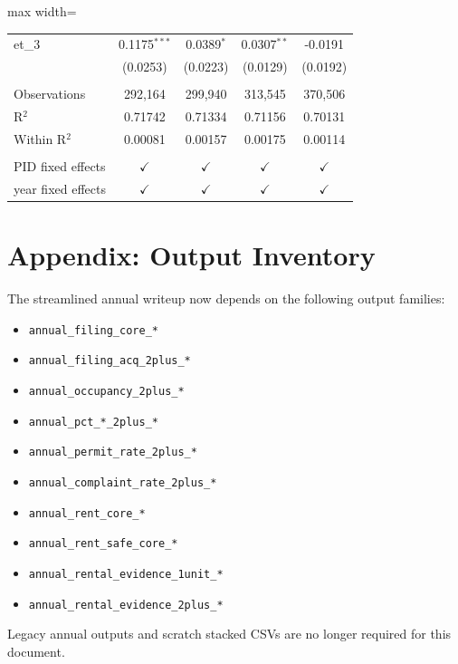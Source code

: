 \documentclass[
  11pt,
]{article}
\providecommand{\tightlist}{%
  \setlength{\itemsep}{0pt}\setlength{\parskip}{0pt}}
\begin{document}
\begin{adjustbox}{max width=\textwidth}
\begin{tabular}{lcccc}
   et\_3              & 0.1175$^{***}$       & 0.0389$^{*}$        & 0.0307$^{**}$   & -0.0191\\   
                      & (0.0253)             & (0.0223)            & (0.0129)        & (0.0192)\\   
    \\
   Observations       & 292,164              & 299,940             & 313,545         & 370,506\\  
   R$^2$              & 0.71742              & 0.71334             & 0.71156         & 0.70131\\  
   Within R$^2$       & 0.00081              & 0.00157             & 0.00175         & 0.00114\\  
    \\
   PID fixed effects  & $\checkmark$         & $\checkmark$        & $\checkmark$    & $\checkmark$\\   
   year fixed effects & $\checkmark$         & $\checkmark$        & $\checkmark$    & $\checkmark$\\   
   \bottomrule
\end{tabular}
\par\endgroup



\end{adjustbox}

\section{Appendix: Output Inventory}\label{appendix-output-inventory}

The streamlined annual writeup now depends on the following output
families:

\begin{itemize}
\tightlist
\item
  \texttt{annual\_filing\_core\_*}
\item
  \texttt{annual\_filing\_acq\_2plus\_*}
\item
  \texttt{annual\_occupancy\_2plus\_*}
\item
  \texttt{annual\_pct\_*\_2plus\_*}
\item
  \texttt{annual\_permit\_rate\_2plus\_*}
\item
  \texttt{annual\_complaint\_rate\_2plus\_*}
\item
  \texttt{annual\_rent\_core\_*}
\item
  \texttt{annual\_rent\_safe\_core\_*}
\item
  \texttt{annual\_rental\_evidence\_1unit\_*}
\item
  \texttt{annual\_rental\_evidence\_2plus\_*}
\end{itemize}

Legacy annual outputs and scratch stacked CSVs are no longer required
for this document.
\end{document}
